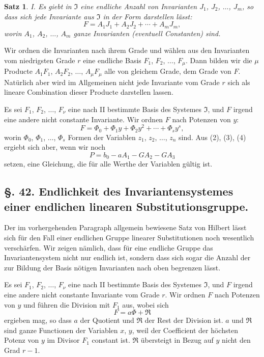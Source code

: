 \documentclass[12pt,a4paper]{article}
\theoremstyle{plain}
\newtheorem{satz}{Satz}[section]
\theoremstyle{definition}
\theoremstyle{remark}
\begin{document}
\begin{satz}
I. Es giebt in $\mathfrak{I}$ eine endliche Anzahl von Invarianten $J_{1}$, $J_{2}$, $\ldots$, $J_{m}$, so dass sich jede Invariante aus $\mathfrak{I}$ in der Form darstellen lässt:
\[
F = A_{1}J_{1} + A_{2}J_{2} + \cdots + A_{m}J_{m},
\]
worin $A_{1}$, $A_{2}$, $\ldots$, $A_{m}$ ganze Invarianten (eventuell Constanten) sind.
\end{satz}

Wir ordnen die Invarianten nach ihrem Grade und wählen aus den Invarianten vom niedrigsten Grade $r$ eine endliche Basis $F_{1}$, $F_{2}$, $\ldots$, $F_{\mu}$. Dann bilden wir die $\mu$ Producte $A_{1}F_{1}$, $A_{2}F_{2}$, $\ldots$, $A_{\mu}F_{\mu}$ alle von gleichem Grade, dem Grade von $F$. Natürlich aber wird im Allgemeinen nicht jede Invariante vom Grade $r$ sich als lineare Combination dieser Producte darstellen lassen.

Es sei $F_{1}$, $F_{2}$, $\ldots$, $F_{\nu}$ eine nach II bestimmte Basis des Systemes $\mathfrak{I}$, und $F$ irgend eine andere nicht constante Invariante. Wir ordnen $F$ nach Potenzen von $y$:
\[
F = \Phi_{0} + \Phi_{1}y + \Phi_{2}y^{2} + \cdots + \Phi_{s}y^{s},
\]
worin $\Phi_{0}$, $\Phi_{1}$, $\ldots$, $\Phi_{s}$ Formen der Variablen $z_{1}$, $z_{2}$, $\ldots$, $z_{n}$ sind. Aus (2), (3), (4) ergiebt sich aber, wenn wir noch
\[
P = b_{0} - aA_{1} - GA_{2} - GA_{3}
\]
setzen, eine Gleichung, die für alle Werthe der Variablen gültig ist.


\subsection*{\S. 42. Endlichkeit des Invariantensystemes einer endlichen linearen Substitutionsgruppe.}

Der im vorhergehenden Paragraph allgemein bewiesene Satz von Hilbert lässt sich für den Fall einer endlichen Gruppe linearer Substitutionen noch wesentlich verschärfen. Wir zeigen nämlich, dass für eine endliche Gruppe das Invariantensystem nicht nur endlich ist, sondern dass sich sogar die Anzahl der zur Bildung der Basis nötigen Invarianten nach oben begrenzen lässt.

Es sei $F_{1}$, $F_{2}$, $\ldots$, $F_{\nu}$ eine nach II bestimmte Basis des Systemes $\mathfrak{I}$, und $F$ irgend eine andere nicht constante Invariante vom Grade $r$. Wir ordnen $F$ nach Potenzen von $y$ und führen die Division mit $F_{1}$ aus, wobei sich
\begin{equation}
F = a\Phi + \mathfrak{R}
\end{equation}
ergieben mag, so dass $a$ der Quotient und $\mathfrak{R}$ der Rest der Division ist. $a$ und $\mathfrak{R}$ sind ganze Functionen der Variablen $x$, $y$, weil der Coefficient der höchsten Potenz von $y$ im Divisor $F_{1}$ constant ist. $\mathfrak{R}$ übersteigt in Bezug auf $y$ nicht den Grad $r-1$.
\end{document}
